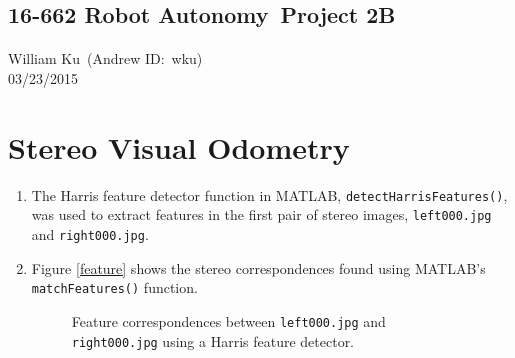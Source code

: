 \documentclass[12pt]{article} %
\def\Name{William Ku}  %
\def\ID{wku}  %
\def\Date{03/23/2015} %
\def\Class{16-662 Robot Autonomy} %
\def\Proj{2B} %
\begin{document}
\begin{center}
	\subsection*{\Class\ Project \Proj}
	\paragraph{} \Name\ (Andrew ID:\ \ID)\\\Date
\end{center}


\section{Stereo Visual Odometry}
\begin{enumerate}[label=\alph*)]
\item %
The Harris feature detector function in MATLAB, \texttt{detectHarrisFeatures()}, was used to extract features in the first pair of stereo images, \texttt{left000.jpg} and \texttt{right000.jpg}.

\item %
Figure \ref{feature} shows the stereo correspondences found using MATLAB's \texttt{matchFeatures()} function.

\begin{figure}[b!]
	\centering

	\caption{Feature correspondences between \texttt{left000.jpg} and \texttt{right000.jpg} using a Harris feature detector.}
\end{figure}


\end{enumerate}
\end{document}

